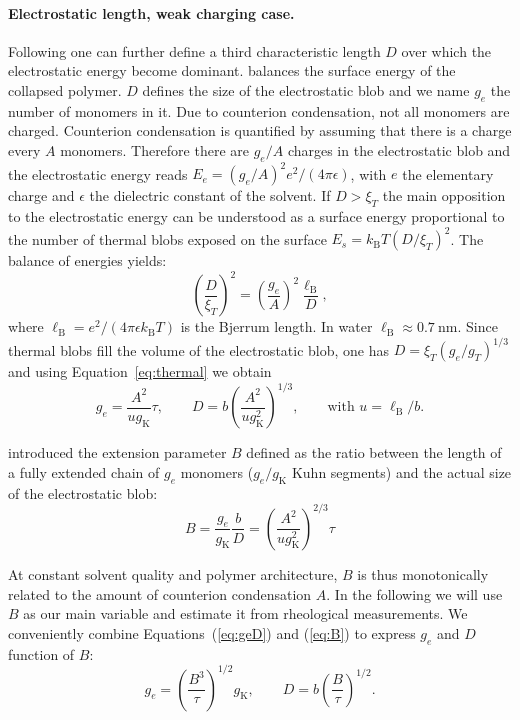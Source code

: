 \documentclass[twoside,twocolumn,9pt]{article}
\begin{document}
\paragraph{Electrostatic length, weak charging case.}
Following \citet{Khokhlov1980} one can further define a third characteristic length $D$ over which the electrostatic energy become dominant. balances the surface energy of the collapsed polymer. $D$ defines the size of the electrostatic blob and we name $g_e$ the number of monomers in it. Due to counterion condensation, not all monomers are charged. Counterion condensation is quantified by assuming that there is a charge every $A$ monomers. Therefore there are $g_e/A$ charges in the electrostatic blob and the electrostatic energy reads $E_e = (g_e/A)^2 e^2/(4\pi\epsilon)$, with $e$ the elementary charge and $\epsilon$ the dielectric constant of the solvent. If $D>\xi_T$ the main opposition to the electrostatic energy can be understood as a surface energy proportional to the number of thermal blobs exposed on the surface $E_s = k_\mathrm{B}T (D/\xi_T)^2$. The balance of energies yields:
\begin{equation}\left(\frac{D}{\xi_T}\right)^2 = \left(\frac{g_e}{A}\right)^2 \frac{\ell_\mathrm{B}}{D},
\label{eq:electrosurface}
\end{equation}
where $\ell_\mathrm{B} = e^2/(4\pi\epsilon k_\mathrm{B}T)$ is the Bjerrum length. In water $\ell_\mathrm{B} \approx \SI{0.7}{\nano\metre}$. Since thermal blobs fill the volume of the electrostatic blob, one has $D = \xi_T \left(g_e/g_T\right)^{1/3}$ and using Equation~\eqref{eq:thermal} we obtain
\begin{equation}
g_e = \frac{A^2}{u g_\mathrm{K}} \tau, \qquad D = b\left(\frac{A^2}{u g_\mathrm{K}^2}\right)^{1/3},\qquad \text{with }u = \ell_\mathrm{B}/b.
\label{eq:geD}
\end{equation}

\citet{Dobrynin1995} introduced the extension parameter $B$ defined as the ratio between the length of a fully extended chain of $g_e$ monomers ($g_e/g_\mathrm{K}$ Kuhn segments) and the actual size of the electrostatic blob: 
\begin{equation}
B = \frac{g_e}{g_\mathrm{K}}\frac{b}{D} = \left(\frac{A^2}{u g_\mathrm{K}^2}\right)^{2/3} \tau
\label{eq:B}
\end{equation}

At constant solvent quality and polymer architecture, $B$ is thus monotonically related to the amount of counterion condensation $A$. In the following we will use $B$ as our main variable and estimate it from rheological measurements. We conveniently combine Equations~(\ref{eq:geD}) and (\ref{eq:B}) to express $g_e$ and $D$ function of $B$:
\begin{equation}
g_e = \left(\frac{B^3}{\tau}\right)^{1/2} g_\mathrm{K},\qquad D = b \left(\frac{B}{\tau}\right)^{1/2}.
\label{eq:geDfromlargeB}
\end{equation}
\end{document}
